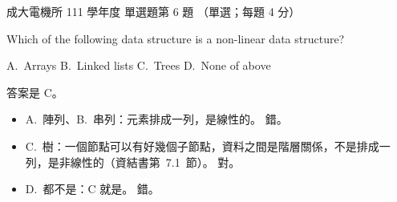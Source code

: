 \begin{pastexam}[label={px:ncku-111-ee-ds-06}]{成大電機所 111 學年度 單選題第 6 題}
（單選；每題 4 分）

Which of the following data structure is a non-linear data structure?

A.~Arrays \qquad B.~Linked lists \qquad C.~Trees \qquad D.~None of above
\end{pastexam}

\begin{pastsoln}
答案是 C。

\begin{itemize}
\item A.~陣列、B.~串列：元素排成一列，是線性的。 錯。
\item C.~樹：一個節點可以有好幾個子節點，資料之間是階層關係，不是排成一列，是非線性的（資結書第~7.1~節）。 對。
\item D.~都不是：C 就是。 錯。
\end{itemize}
\end{pastsoln}
